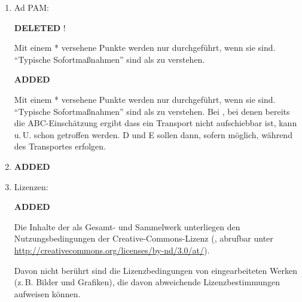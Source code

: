 \documentclass[
ngerman,
paper=a4,
asymmetric,
fontsize=10pt,
headings=small,
draft=false,
numbers=noenddot,
bibtotocnumbered,
footnotes=multiple,
]{scrreprt}
\newcommand{\jALT}{{\color{red}\sffamily\textbf{DELETED}\hrulefill\newline\newline}}
\newcommand{\jALTende}{\newline{\color{red}\rule{\linewidth}{2pt}\newline}}
\newcommand{\jNEU}{{\color{green}\sffamily\textbf{ADDED}\hrulefill\newline\newline}}
\newcommand{\jNEUende}{\newline{\color{green}\rule{\linewidth}{3pt}\newline}}
\begin{document}
\begin{enumerate}
\item Ad PAM:

\jALT
   !

 {\tiny Mit einem * versehene Punkte werden nur durchgeführt,
 wenn sie  sind. \enquote{Typische
Sofortmaßnahmen} sind als  zu verstehen.}
\jALTende

\jNEU
{}

 {\tiny Mit einem * versehene Punkte werden nur durchgeführt,
 wenn sie  sind. \enquote{Typische
Sofortmaßnahmen} sind als  zu verstehen.
Bei , bei denen bereits die 
ABC-Einschätzung ergibt dass ein Transport nicht aufschiebbar ist, 
kann u.\,U. schon  getroffen werden. 
D und E sollen dann, sofern möglich, während des 
Transportes erfolgen. }
\jNEUende

\item 

\jNEU
{}
\jNEUende

\item Lizenzen:

\jNEU
{}

Die Inhalte der {\AASS} als Gesamt- und Sammelwerk unterliegen 
den Nutzungsbedingungen der Creative-Commons-Lizenz  (, 
abrufbar
unter
\url{http://creativecommons.org/licenses/by-nd/3.0/at/}).

Davon nicht berührt sind die Lizenzbedingungen von eingearbeiteten Werken
(z.\,B. Bilder und Grafiken), die davon abweichende
Lizenzbestimmungen aufweisen können.

{

}
\end{enumerate}
\end{document}
